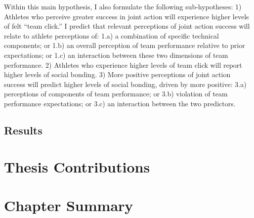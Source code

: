 Within this main hypothesis, I also formulate the following sub-hypotheses:
1)	Athletes who perceive greater success in joint action will experience higher levels of felt ``team click.'' I predict that relevant perceptions of joint action success will relate to athlete perceptions of:
1.a) a combination of specific technical components; or
1.b) an overall perception of team performance relative to prior expectations; or
1.c) an interaction between these two dimensions of team performance.
2)	Athletes who experience higher levels of team click will report higher levels of social bonding.
3)	More positive perceptions of joint action success will predict higher levels of social bonding, driven by more positive:
3.a) perceptions of components of team performance; or
3.b) violation of team performance expectations; or
3.c) an interaction between the two predictors.



\subsection{Results}

\section{Thesis Contributions}

\section{Chapter Summary}

